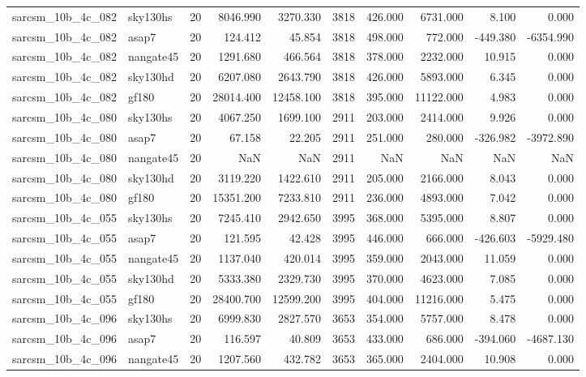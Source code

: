 \begin{longtable}{llrrrrrrrr}
sarcsm\_10b\_4c\_082 & sky130hs & 20 & 8046.990 & 3270.330 & 3818 & 426.000 & 6731.000 & 8.100 & 0.000 \\
sarcsm\_10b\_4c\_082 & asap7 & 20 & 124.412 & 45.854 & 3818 & 498.000 & 772.000 & -449.380 & -6354.990 \\
sarcsm\_10b\_4c\_082 & nangate45 & 20 & 1291.680 & 466.564 & 3818 & 378.000 & 2232.000 & 10.915 & 0.000 \\
sarcsm\_10b\_4c\_082 & sky130hd & 20 & 6207.080 & 2643.790 & 3818 & 426.000 & 5893.000 & 6.345 & 0.000 \\
sarcsm\_10b\_4c\_082 & gf180 & 20 & 28014.400 & 12458.100 & 3818 & 395.000 & 11122.000 & 4.983 & 0.000 \\
sarcsm\_10b\_4c\_080 & sky130hs & 20 & 4067.250 & 1699.100 & 2911 & 203.000 & 2414.000 & 9.926 & 0.000 \\
sarcsm\_10b\_4c\_080 & asap7 & 20 & 67.158 & 22.205 & 2911 & 251.000 & 280.000 & -326.982 & -3972.890 \\
sarcsm\_10b\_4c\_080 & nangate45 & 20 & NaN & NaN & 2911 & NaN & NaN & NaN & NaN \\
sarcsm\_10b\_4c\_080 & sky130hd & 20 & 3119.220 & 1422.610 & 2911 & 205.000 & 2166.000 & 8.043 & 0.000 \\
sarcsm\_10b\_4c\_080 & gf180 & 20 & 15351.200 & 7233.810 & 2911 & 236.000 & 4893.000 & 7.042 & 0.000 \\
sarcsm\_10b\_4c\_055 & sky130hs & 20 & 7245.410 & 2942.650 & 3995 & 368.000 & 5395.000 & 8.807 & 0.000 \\
sarcsm\_10b\_4c\_055 & asap7 & 20 & 121.595 & 42.428 & 3995 & 446.000 & 666.000 & -426.603 & -5929.480 \\
sarcsm\_10b\_4c\_055 & nangate45 & 20 & 1137.040 & 420.014 & 3995 & 359.000 & 2043.000 & 11.059 & 0.000 \\
sarcsm\_10b\_4c\_055 & sky130hd & 20 & 5333.380 & 2329.730 & 3995 & 370.000 & 4623.000 & 7.085 & 0.000 \\
sarcsm\_10b\_4c\_055 & gf180 & 20 & 28400.700 & 12599.200 & 3995 & 404.000 & 11216.000 & 5.475 & 0.000 \\
sarcsm\_10b\_4c\_096 & sky130hs & 20 & 6999.830 & 2827.570 & 3653 & 354.000 & 5757.000 & 8.478 & 0.000 \\
sarcsm\_10b\_4c\_096 & asap7 & 20 & 116.597 & 40.809 & 3653 & 433.000 & 686.000 & -394.060 & -4687.130 \\
sarcsm\_10b\_4c\_096 & nangate45 & 20 & 1207.560 & 432.782 & 3653 & 365.000 & 2404.000 & 10.908 & 0.000 \\

\end{longtable}
